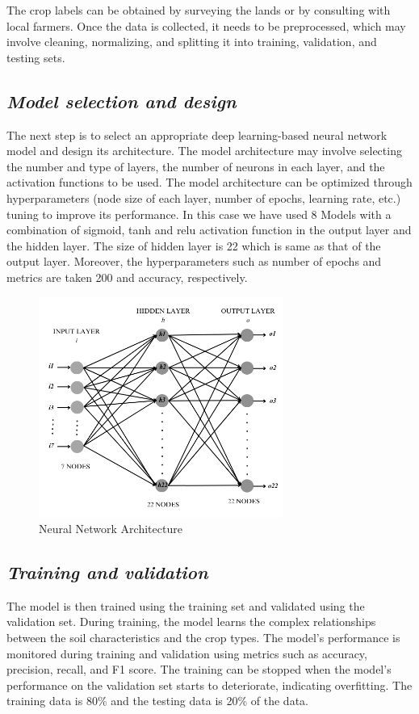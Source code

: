 \documentclass[conference]{IEEEtran}
\begin{document}
The crop labels can be obtained by surveying the lands or by consulting with local farmers. Once the data is collected, it needs to be preprocessed, which may involve cleaning, normalizing, and splitting it into training, validation, and testing sets.

\subsection{\emph{\textbf{Model selection and design}}}
The next step is to select an appropriate deep learning-based neural network model and design its architecture. The model architecture may involve selecting the number and type of layers, the number of neurons in each layer, and the activation functions to be used. The model architecture can be optimized through hyperparameters (node size of each layer, number of epochs, learning rate, etc.) tuning to improve its performance. In this case we have used 8 Models with a combination of sigmoid, tanh and relu activation function in the output layer and the hidden layer. The size of hidden layer is 22 which is same as that of the output layer. Moreover, the hyperparameters such as number of epochs and metrics are taken 200 and accuracy, respectively.

\begin{figure}[h!]
    \centering
    \includegraphics[width = 8cm] {7 nodes.png}
    \caption{Neural Network Architecture}
    \label{fig:Neural Network Architecture}
\end{figure}

\subsection{\emph{\textbf{Training and validation}}}
The model is then trained using the training set and validated using the validation set. During training, the model learns the complex relationships between the soil characteristics and the crop types. The model's performance is monitored during training and validation using metrics such as accuracy, precision, recall, and F1 score. The training can be stopped when the model's performance on the validation set starts to deteriorate, indicating overfitting. The training data is 80\% and the testing data is 20\% of the data. 
\end{document}
